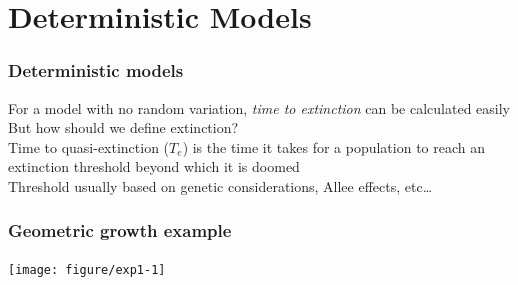 \documentclass[color=usenames,dvipsnames]{beamer}\usepackage[]{graphicx}\usepackage[]{color}
\begin{document}
\section{Deterministic Models}






\begin{frame}
  \frametitle{Deterministic models}
  \Large
  For a model with no random variation, \textit{time to extinction} can
      be calculated easily \\
  \pause \vfill
  But how should we define extinction? \\
  \pause \vfill
  Time to quasi-extinction ($T_e$) is the time it takes for a
      population to reach an extinction threshold beyond which it is
      doomed \\
  \pause \vfill
  Threshold usually based on genetic considerations, Allee
      effects, etc\dots
\end{frame}





\begin{frame}[fragile]
  \frametitle{Geometric growth example}

\texttt{[image: figure/exp1-1]}
\end{frame}
\end{document}

